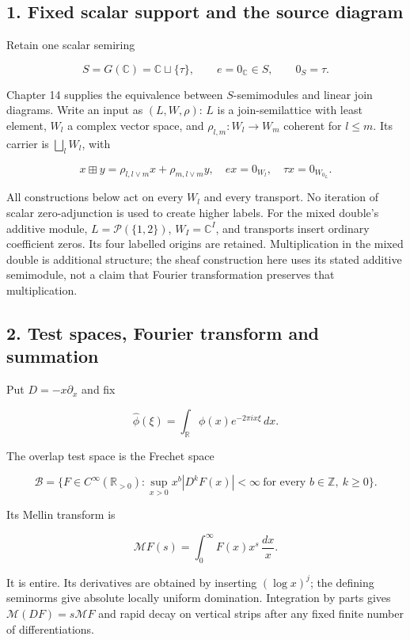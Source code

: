 \documentclass[
]{article}
\begin{document}
\subsection{1. Fixed scalar support and the source
diagram}\label{fixed-scalar-support-and-the-source-diagram}

Retain one scalar semiring

\[
S=G(\mathbb C)=\mathbb C\sqcup\{\tau\},\qquad e=0_{\mathbb C}\in S,\qquad 0_S=\tau.
\]

Chapter 14 supplies the equivalence between \(S\)-semimodules and linear
join diagrams. Write an input as \((L,W,\rho)\): \(L\) is a
join-semilattice with least element, \(W_l\) a complex vector space, and
\(\rho_{l,m}:W_l\to W_m\) coherent for \(l\le m\). Its carrier is
\(\bigsqcup_l W_l\), with

\[
x\boxplus y=\rho_{l,l\vee m}x+\rho_{m,l\vee m}y,\quad ex=0_{W_l},\quad \tau x=0_{W_{0_L}}.
\]

All constructions below act on every \(W_l\) and every transport. No
iteration of scalar zero-adjunction is used to create higher labels. For
the mixed double's additive module, \(L=\mathcal P(\{1,2\})\),
\(W_I=\mathbb C^I\), and transports insert ordinary coefficient zeros.
Its four labelled origins are retained. Multiplication in the mixed
double is additional structure; the sheaf construction here uses its
stated additive semimodule, not a claim that Fourier transformation
preserves that multiplication.

\subsection{2. Test spaces, Fourier transform and
summation}\label{test-spaces-fourier-transform-and-summation}

Put \(D=-x\partial_x\) and fix

\[
\widehat\phi(\xi)=\int_{\mathbb R}\phi(x)e^{-2\pi i x\xi}\,dx.
\]

The overlap test space is the Frechet space

\[
\mathscr B=\{F\in C^\infty(\mathbb R_{>0}):\sup_{x>0}x^b|D^kF(x)|<\infty\ \text{for every }b\in\mathbb Z,\ k\ge0\}.
\]

Its Mellin transform is

\[
\mathcal MF(s)=\int_0^\infty F(x)x^s\,\frac{dx}{x}.
\]

It is entire. Its derivatives are obtained by inserting \((\log x)^j\);
the defining seminorms give absolute locally uniform domination.
Integration by parts gives \(\mathcal M(DF)=s\mathcal MF\) and rapid
decay on vertical strips after any fixed finite number of
differentiations.
\end{document}
